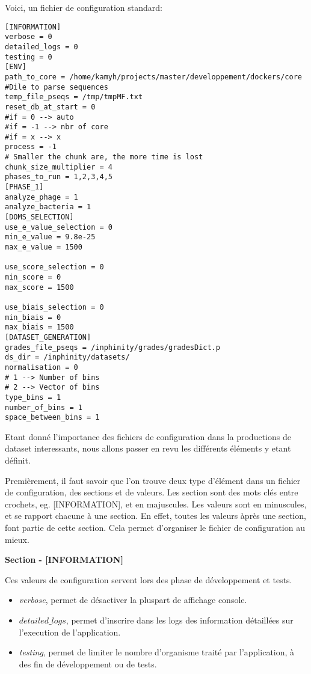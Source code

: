 Voici, un fichier de configuration standard:

\begin{lstlisting}[frame=single]
[INFORMATION]
verbose = 0
detailed_logs = 0
testing = 0
[ENV]
path_to_core = /home/kamyh/projects/master/developpement/dockers/core
#Dile to parse sequences
temp_file_pseqs = /tmp/tmpMF.txt
reset_db_at_start = 0
#if = 0 --> auto
#if = -1 --> nbr of core
#if = x --> x
process = -1
# Smaller the chunk are, the more time is lost
chunk_size_multiplier = 4
phases_to_run = 1,2,3,4,5
[PHASE_1]
analyze_phage = 1
analyze_bacteria = 1
[DOMS_SELECTION]
use_e_value_selection = 0
min_e_value = 9.8e-25
max_e_value = 1500

use_score_selection = 0
min_score = 0
max_score = 1500

use_biais_selection = 0
min_biais = 0
max_biais = 1500
[DATASET_GENERATION]
grades_file_pseqs = /inphinity/grades/gradesDict.p
ds_dir = /inphinity/datasets/
normalisation = 0
# 1 --> Number of bins
# 2 --> Vector of bins
type_bins = 1
number_of_bins = 1
space_between_bins = 1
\end{lstlisting}

Etant donné l'importance des fichiers de configuration dans la productions de dataset interessants, nous allons passer en revu les différents éléments y etant définit.

Premièrement, il faut savoir que l'on trouve deux type d'élément dans un fichier de configuration, des sections et de valeurs. Les section sont des mots clés entre crochets, eg. [INFORMATION], et en majuscules. Les valeurs sont en minuscules, et se rapport chacune à une section. En effet, toutes les valeurs àprès une section, font partie de cette section. Cela permet d'organiser le fichier de configuration au mieux.

\textbf{Section - [INFORMATION]}

Ces valeurs de configuration servent lors des phase de développement et tests.

\begin{itemize}
\item \emph{verbose}, permet de désactiver la pluspart de affichage console.
\item \emph{$detailed\_logs$}, permet d'inscrire dans les logs des information détaillées sur l'execution de l'application.
\item \emph{testing}, permet de limiter le nombre d'organisme traité par l'application, à des fin de développement ou de tests. 
\end{itemize}

